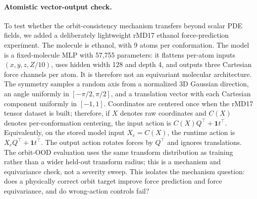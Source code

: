 \paragraph{Atomistic vector-output check.} To test whether the orbit-consistency mechanism transfers beyond scalar PDE fields, we added a deliberately lightweight rMD17 ethanol force-prediction experiment. The molecule is ethanol, with 9 atoms per conformation. The model is a fixed-molecule MLP with 57,755 parameters: it flattens per-atom inputs \((x,y,z,Z/10)\), uses hidden width 128 and depth 4, and outputs three Cartesian force channels per atom. It is therefore not an equivariant molecular architecture. The symmetry samples a random axis from a normalized 3D Gaussian direction, an angle uniformly in \([-\pi/2,\pi/2]\), and a translation vector with each Cartesian component uniformly in \([-1,1]\). Coordinates are centered once when the rMD17 tensor dataset is built; therefore, if \(X\) denotes raw coordinates and \(C(X)\) denotes per-conformation centering, the input action is \(C(X)Q^\top+\mathbf{1}t^\top\). Equivalently, on the stored model input \(X_c=C(X)\), the runtime action is \(X_cQ^\top+\mathbf{1}t^\top\). The output action rotates forces by \(Q^\top\) and ignores translations. The orbit-OOD evaluation uses the same transform distribution as training rather than a wider held-out transform radius; this is a mechanism and equivariance check, not a severity sweep. This isolates the mechanism question: does a physically correct orbit target improve force prediction and force equivariance, and do wrong-action controls fail?

\begin{table}[t]
\centering
\small
\caption{rMD17 ethanol force-prediction mechanism check at 500 labeled conformations. Entries are mean \(\pm\) sample standard deviation over matched seeds.}
\label{tab:new-rmd17-ethanol-500}
\end{table}


